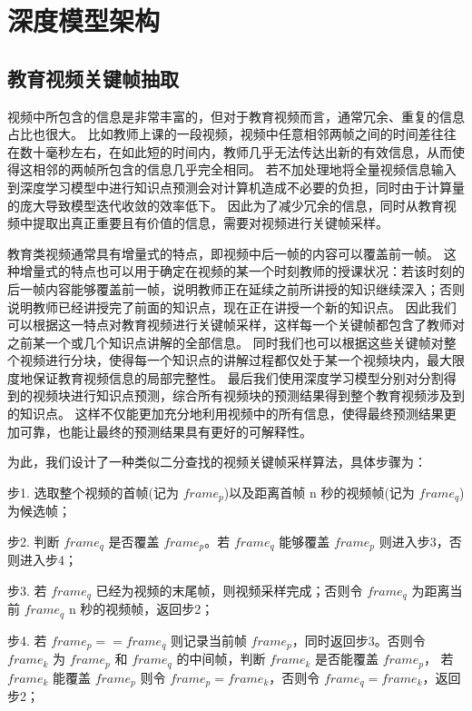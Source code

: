 \chapter{深度模型架构}

\section{教育视频关键帧抽取}
    视频中所包含的信息是非常丰富的，但对于教育视频而言，通常冗余、重复的信息占比也很大。
    比如教师上课的一段视频，视频中任意相邻两帧之间的时间差往往在数十毫秒左右，在如此短的时间内，教师几乎无法传达出新的有效信息，从而使得这相邻的两帧所包含的信息几乎完全相同。
    若不加处理地将全量视频信息输入到深度学习模型中进行知识点预测会对计算机造成不必要的负担，同时由于计算量的庞大导致模型迭代收敛的效率低下。
    因此为了减少冗余的信息，同时从教育视频中提取出真正重要且有价值的信息，需要对视频进行关键帧采样。

    教育类视频通常具有增量式\cite{Wang2020FineGrainedSM}的特点，即视频中后一帧的内容可以覆盖前一帧。
    这种增量式的特点也可以用于确定在视频的某一个时刻教师的授课状况：若该时刻的后一帧内容能够覆盖前一帧，说明教师正在延续之前所讲授的知识继续深入；否则说明教师已经讲授完了前面的知识点，现在正在讲授一个新的知识点。
    因此我们可以根据这一特点对教育视频进行关键帧采样，这样每一个关键帧都包含了教师对之前某一个或几个知识点讲解的全部信息。
    同时我们也可以根据这些关键帧对整个视频进行分块，使得每一个知识点的讲解过程都仅处于某一个视频块内，最大限度地保证教育视频信息的局部完整性。
    最后我们使用深度学习模型分别对分割得到的视频块进行知识点预测，综合所有视频块的预测结果得到整个教育视频涉及到的知识点。
    这样不仅能更加充分地利用视频中的所有信息，使得最终预测结果更加可靠，也能让最终的预测结果具有更好的可解释性。

    为此，我们设计了一种类似二分查找的视频关键帧采样算法，具体步骤为：

    步1. 选取整个视频的首帧(记为 $frame_{p}$)以及距离首帧 n 秒的视频帧(记为 $frame_{q}$)为候选帧；

    步2. 判断 $frame_{q}$ 是否覆盖 $frame_{p}$。若 $frame_{q}$ 能够覆盖 $frame_{p}$ 则进入步3，否则进入步4；

    步3. 若 $frame_{q}$ 已经为视频的末尾帧，则视频采样完成；否则令 $frame_{q}$ 为距离当前 $frame_{q}$ n 秒的视频帧，返回步2；

    步4. 若 $frame_{p} == frame_{q}$ 则记录当前帧 $frame_{p}$，同时返回步3。否则令 $frame_{k}$ 为 $frame_{p}$ 和 $frame_{q}$ 的中间帧，判断 $frame_{k}$ 是否能覆盖 $frame_{p}$，
    若 $frame_{k}$ 能覆盖 $frame_{p}$ 则令 $frame_{p} = frame_{k}$，否则令 $frame_{q} = frame_{k}$，返回步2；

